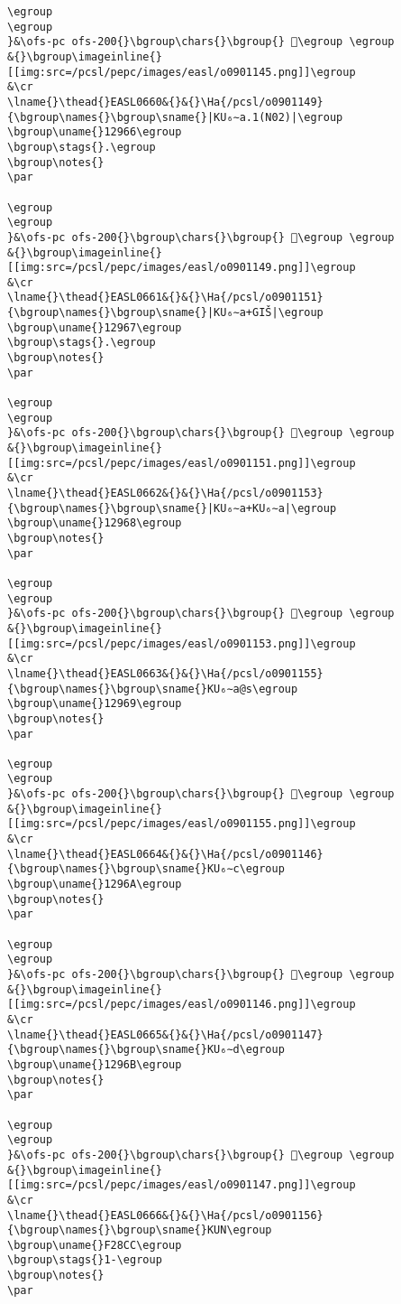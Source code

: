 \begin{verbatim}
\egroup
\egroup
}&\ofs-pc ofs-200{}\bgroup\chars{}\bgroup{} 𒥥\egroup \egroup
&{}\bgroup\imageinline{}[[img:src=/pcsl/pepc/images/easl/o0901145.png]]\egroup
&\cr
\lname{}\thead{}EASL0660&{}&{}\Ha{/pcsl/o0901149}{\bgroup\names{}\bgroup\sname{}|KU₆∼a.1(N02)|\egroup
\bgroup\uname{}12966\egroup
\bgroup\stags{}.\egroup
\bgroup\notes{}
\par 

\egroup
\egroup
}&\ofs-pc ofs-200{}\bgroup\chars{}\bgroup{} 𒥦\egroup \egroup
&{}\bgroup\imageinline{}[[img:src=/pcsl/pepc/images/easl/o0901149.png]]\egroup
&\cr
\lname{}\thead{}EASL0661&{}&{}\Ha{/pcsl/o0901151}{\bgroup\names{}\bgroup\sname{}|KU₆∼a+GIŠ|\egroup
\bgroup\uname{}12967\egroup
\bgroup\stags{}.\egroup
\bgroup\notes{}
\par 

\egroup
\egroup
}&\ofs-pc ofs-200{}\bgroup\chars{}\bgroup{} 𒥧\egroup \egroup
&{}\bgroup\imageinline{}[[img:src=/pcsl/pepc/images/easl/o0901151.png]]\egroup
&\cr
\lname{}\thead{}EASL0662&{}&{}\Ha{/pcsl/o0901153}{\bgroup\names{}\bgroup\sname{}|KU₆∼a+KU₆∼a|\egroup
\bgroup\uname{}12968\egroup
\bgroup\notes{}
\par 

\egroup
\egroup
}&\ofs-pc ofs-200{}\bgroup\chars{}\bgroup{} 𒥨\egroup \egroup
&{}\bgroup\imageinline{}[[img:src=/pcsl/pepc/images/easl/o0901153.png]]\egroup
&\cr
\lname{}\thead{}EASL0663&{}&{}\Ha{/pcsl/o0901155}{\bgroup\names{}\bgroup\sname{}KU₆∼a@s\egroup
\bgroup\uname{}12969\egroup
\bgroup\notes{}
\par 

\egroup
\egroup
}&\ofs-pc ofs-200{}\bgroup\chars{}\bgroup{} 𒥩\egroup \egroup
&{}\bgroup\imageinline{}[[img:src=/pcsl/pepc/images/easl/o0901155.png]]\egroup
&\cr
\lname{}\thead{}EASL0664&{}&{}\Ha{/pcsl/o0901146}{\bgroup\names{}\bgroup\sname{}KU₆∼c\egroup
\bgroup\uname{}1296A\egroup
\bgroup\notes{}
\par 

\egroup
\egroup
}&\ofs-pc ofs-200{}\bgroup\chars{}\bgroup{} 𒥪\egroup \egroup
&{}\bgroup\imageinline{}[[img:src=/pcsl/pepc/images/easl/o0901146.png]]\egroup
&\cr
\lname{}\thead{}EASL0665&{}&{}\Ha{/pcsl/o0901147}{\bgroup\names{}\bgroup\sname{}KU₆∼d\egroup
\bgroup\uname{}1296B\egroup
\bgroup\notes{}
\par 

\egroup
\egroup
}&\ofs-pc ofs-200{}\bgroup\chars{}\bgroup{} 𒥫\egroup \egroup
&{}\bgroup\imageinline{}[[img:src=/pcsl/pepc/images/easl/o0901147.png]]\egroup
&\cr
\lname{}\thead{}EASL0666&{}&{}\Ha{/pcsl/o0901156}{\bgroup\names{}\bgroup\sname{}KUN\egroup
\bgroup\uname{}F28CC\egroup
\bgroup\stags{}1-\egroup
\bgroup\notes{}
\par 


\end{verbatim}

